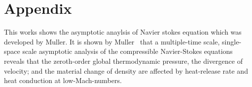 \chapter{Appendix}

\noindent This works shows the asymptotic anaylsis of Navier stokes equation which was developed by Muller\cite{Muller}. It is shown by Muller~\cite{Muller} that a multiple-time scale, single-space scale asymptotic analysis of the compressible Navier-Stokes equations reveals that the zeroth-order global thermodynamic pressure, the divergence of velocity; and the material change of density are affected by heat-release rate and heat conduction at low-Mach-numbers.


